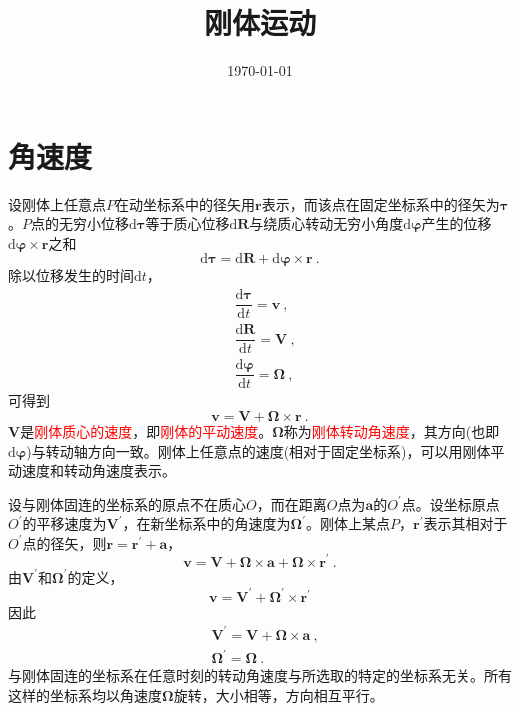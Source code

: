 \documentclass[11pt,a4paper]{article}
\title{刚体运动}
\author{}
\date{\today}
\renewcommand{\vec}[1]{\boldsymbol{#1}}
\newcommand{\dif}{\mathrm{d}}
\begin{document}
\maketitle


\section{角速度}


设刚体上任意点$P$在动坐标系中的径矢用$\vec{r}$表示，而该点在固定坐标系中的径矢为$\vec{\tau}$。$P$点的无穷小位移$\dif \vec{\tau}$等于质心位移$\dif \vec{R}$与绕质心转动无穷小角度$\dif \vec{\varphi}$产生的位移$\dif \vec{\varphi} \times \vec{r}$之和
\begin{equation*}
\dif \vec{\tau} = \dif \vec{R} +\dif \vec{\varphi} \times \vec{r} ~.
\end{equation*}
除以位移发生的时间$\dif t$，
\begin{align*}
& \dfrac{\dif \vec{\tau} }{\dif t} = \vec{v} ~, \\
& \dfrac{\dif \vec{R} }{\dif t} = \vec{V} ~, \\
& \dfrac{\dif \vec{\varphi} }{\dif t} = \vec{\Omega} ~, 
\end{align*}
可得到
\begin{equation}
\vec{v} = \vec{V} + \vec{\Omega} \times \vec{r} ~.
\end{equation}
$\vec{V}$是\textcolor{red}{刚体质心的速度}，即\textcolor{red}{刚体的平动速度}。$\vec{\Omega}$称为\textcolor{red}{刚体转动角速度}，其方向(也即$\dif \vec{\varphi}$)与转动轴方向一致。刚体上任意点的速度(相对于固定坐标系)，可以用刚体平动速度和转动角速度表示。


设与刚体固连的坐标系的原点不在质心$O$，而在距离$O$点为$\vec{a}$的$O^\prime$点。设坐标原点$O^\prime$的平移速度为$\vec{V}^\prime$，在新坐标系中的角速度为$\vec{\Omega}^\prime$。刚体上某点$P$，$\vec{r}^\prime$表示其相对于$O^\prime$点的径矢，则$\vec{r} = \vec{r}^\prime +\vec{a}$，
\begin{equation*}
\vec{v} =  \vec{V} + \vec{\Omega} \times \vec{a} + \vec{\Omega} \times \vec{r}^\prime ~.
\end{equation*}
由$\vec{V}^\prime$和$\vec{\Omega}^\prime$的定义，
\begin{equation*}
\vec{v} = \vec{V}^\prime + \vec{\Omega}^\prime \times \vec{r}^\prime
\end{equation*}
因此
\begin{align}
& \vec{V}^\prime = \vec{V} +\vec{\Omega} \times \vec{a} ~, \\
& \vec{\Omega}^\prime = \vec{\Omega} ~.
\end{align}
与刚体固连的坐标系在任意时刻的转动角速度与所选取的特定的坐标系无关。所有这样的坐标系均以角速度$\vec{\Omega}$旋转，大小相等，方向相互平行。
\end{document}
